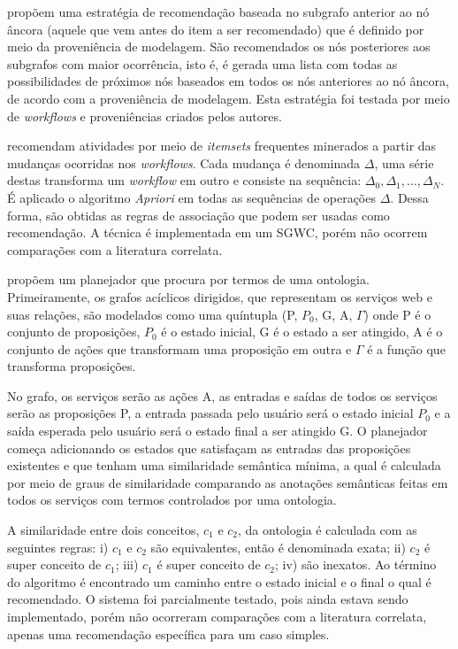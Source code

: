  propõem uma estratégia de recomendação baseada no subgrafo anterior ao nó âncora (aquele que vem antes do item a ser recomendado) que é definido por meio da proveniência de modelagem. São recomendados os nós posteriores aos subgrafos com maior ocorrência, isto é, é gerada uma lista com todas as possibilidades de próximos nós baseados em todos os nós anteriores ao nó âncora, de acordo com a proveniência de modelagem. Esta estratégia foi testada por meio de \emph{workflows} e proveniências criados pelos autores.

 recomendam atividades por meio de \emph{itemsets} frequentes minerados a partir das mudanças ocorridas nos \emph{workflows}. Cada mudança é denominada \(\Delta\), uma série destas transforma um \emph{workflow} em outro e consiste na sequência: \(\Delta_{0}, \Delta_{1}, \ldots, \Delta_{N}\). É aplicado o algoritmo \emph{Apriori} em todas as sequências de operações \(\Delta\). Dessa forma, são obtidas as regras de associação que podem ser usadas como recomendação. A técnica é implementada em um SGWC, porém não ocorrem comparações com a literatura correlata.

 propõem um planejador que procura por termos de uma ontologia. Primeiramente, os grafos acíclicos dirigidos, que representam os serviços web e suas relações, são modelados como uma quíntupla (P, \(P_{0}\), G, A, \(\Gamma\)) onde P é o conjunto de proposições, \(P_{0}\) é o estado inicial, G é o estado a ser atingido, A é o conjunto de ações que transformam uma proposição em outra e \(\Gamma\) é a função que transforma proposições. 

No grafo, os serviços serão as ações A, as entradas e saídas de todos os serviços serão as proposições P, a entrada passada pelo usuário será o estado inicial \(P_{0}\) e a saída esperada pelo usuário será o estado final a ser atingido G. O planejador começa adicionando os estados que satisfaçam as entradas das proposições existentes e que tenham uma similaridade semântica mínima, a qual é calculada por meio de graus de similaridade comparando as anotações semânticas feitas em todos os serviços com termos controlados por uma  ontologia. 

A similaridade entre dois conceitos, \(c_{1}\) e \(c_{2}\), da ontologia é calculada com as seguintes regras: i) \(c_{1}\) e \(c_{2}\) são equivalentes, então é denominada exata; ii) \(c_{2}\) é super conceito de \(c_{1}\); iii) \(c_{1}\) é super conceito de \(c_{2}\); iv) são inexatos. Ao término do algoritmo é encontrado um caminho entre o estado inicial e o final o qual é recomendado. O sistema foi parcialmente testado, pois ainda estava sendo implementado, porém não ocorreram comparações com a literatura correlata, apenas uma recomendação específica para um caso simples.

